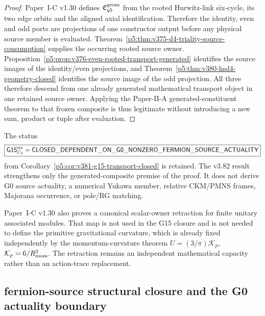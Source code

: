 \documentclass[12pt,a4paper]{article}
\begin{document}
\begin{proof}
Paper~I-C v1.30 defines $\mathfrak C_{q5}^{\rm geom}$ from the rooted
Hurwitz-link six-cycle, its two edge orbits and the aligned axial
identification.  Therefore the identity, even and odd ports are projections
of one constructor output before any physical source member is evaluated.
Theorem~\ref{p5:thm:v375-d4-triality-source-consumption} supplies the occurring
rooted source owner.  Proposition~\ref{p5:prop:v376-even-rooted-transport-generated}
identifies the source images of the identity/even projections, and
Theorem~\ref{p5:thm:v380-hsd4-geometry-closed} identifies the source image of
the odd projection.  All three therefore descend from one already generated
mathematical transport object in one retained source owner.  Applying the
Paper-II-A generated-constituent theorem to that frozen composite is thus
legitimate without introducing a new sum, product or tuple after evaluation.
\end{proof}

\begin{corollary}
\label{p5:cor:v382-g15-closure-hardened}
The status
\[
 \boxed{
 \mathsf{G15}_{C_3}^{\rm src}
 =\mathsf{CLOSED\_DEPENDENT\_ON\_G0\_NONZERO\_FERMION\_SOURCE\_ACTUALITY}}
\]
from Corollary~\ref{p5:cor:v381-g15-transport-closed} is retained.  The v3.82
result strengthens only the generated-composite premise of the proof.  It does
not derive G0 source actuality, a numerical Yukawa member, relative CKM/PMNS
frames, Majorana occurrence, or pole/RG matching.
\end{corollary}

\begin{remark}
\label{p5:rem:v382-no-owner-retraction-in-g15}
Paper~I-C v1.30 also proves a canonical scalar-owner retraction for finite
unitary associated modules.  That map is not used in the G15 closure and is
not needed to define the primitive gravitational curvature, which is already
fixed independently by the momentum-curvature theorem
\(U=(3/\pi)\mathcal K_p\), \(\mathcal K_p=6/R_{\rm mom}^2\).  The retraction remains an independent mathematical
capacity rather than an action-trace replacement.
\end{remark}



\subsection{fermion-source structural closure and the G0 actuality boundary}
\label{p5:sec:v385-fermion-source-boundary}
\end{document}
